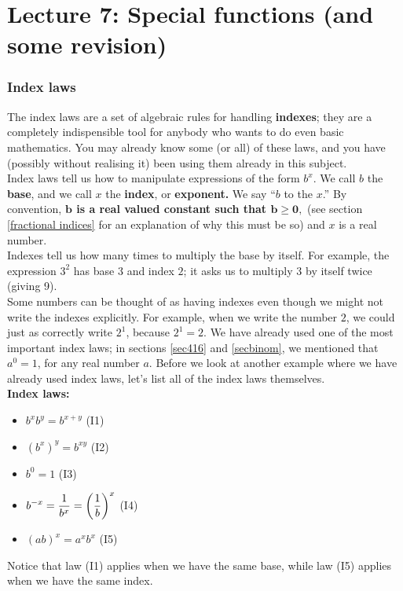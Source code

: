 
\chapter{Lecture 7: Special functions (and some revision)} \label{lec7}

\subsection{Index laws} \label{base} \label{index} \label{exponent}
The index laws are a set of algebraic rules for handling \textbf{indexes}; they are a completely indispensible tool for anybody who wants to do even basic mathematics. You may already know some (or all) of these laws, and you have (possibly without realising it) been using them already in this subject. \\

\noindent Index laws tell us how to manipulate expressions of the form $b^x$. We call $b$ the \textbf{base}, and we call $x$ the \textbf{index}, or \textbf{exponent.} We say ``$b$ to the $x$.'' By convention, \textbf{$\boldsymbol{b}$ is a real valued constant such that $\boldsymbol{b \geq 0,}$} (see section \ref{fractional indices} for an explanation of why this must be so) and $x$ is a real number. \\

\noindent Indexes tell us how many times to multiply the base by itself. For example, the expression $3^2$ has base $3$ and index $2$; it asks us to multiply $3$ by itself twice (giving 9). \\

\noindent Some numbers can be thought of as having indexes even though we might not write the indexes explicitly. For example, when we write the number $2$, we could just as correctly write $2^1$, because $2^1 = 2$. We have already used one of the most important index laws; in sections \ref{sec416} and \ref{secbinom}, we mentioned that $a^0 = 1$, for any real number $a$.
Before we look at another example where we have already used index laws, let's list all of the index laws themselves. \\

\textbf{Index laws:}
\begin{itemize}
\item $b^xb^y = b^{x+y}$ \hfill  (I1) \smallskip \smallskip
\item $(b^x)^y = b^{xy}$ \hfill  (I2) \smallskip \smallskip
\item $b^0 = 1$ \hfill  (I3)
\item $\displaystyle{b^{-x} = \frac{1}{b^x} = \left(\frac{1}{b}\right)^x}$ \hfill  (I4)
\item $(ab)^x = a^xb^x$   \hfill  (I5)
\end{itemize}
Notice that law (I1) applies when we have the same base, while law (I5) applies when we have the same index. \\

